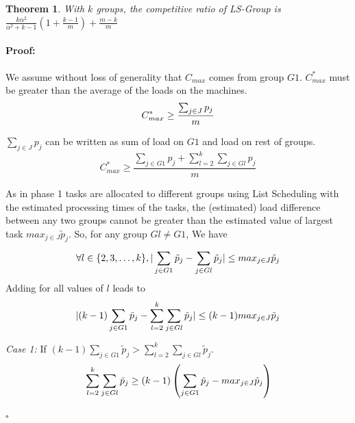 \documentclass[12pt]{article}
\theoremstyle{mystyle}
\newtheorem{theorem}{Theorem}
\newenvironment{myproof}{\paragraph{Proof:}}{\hfill$\square$}
\begin{document}
    \begin{theorem}
      \label{th:strategy3}
      With $k$ groups, the competitive ratio of
      \textit{LS-Group } is $ \frac{k\alpha^{2}}{\alpha^{2}+k-1} (1+
      {\frac{k-1}{m}} ) + \frac{m-k}{m}$
    \end{theorem}
    \begin{myproof} 
      We assume without loss of generality that $ C_{max}$ comes from
      group $G1$. $C_{max}^{*}$ must be greater than the average of the
      loads on the machines.
      \begin{equation}{\nonumber}
        C_{max}^{*} \geq  \frac{\sum_{j \in J}^{}{{p_{j}}}}{m}
      \end{equation}
    
      $\sum_{j \in J }{{p_{j}}}$ can be written as sum of load on $G1$ and
      load on rest of groups.
      \begin{equation}\label{eq11}
        C_{max}^{*} \geq  \frac{\sum_{j \in G1 }^{}{{p_{j}}}+ \sum_{l=2}^{k}\sum_{j \in Gl }^{}{{p_{j}}}}{m}
      \end{equation}
    
      As in phase 1 tasks are allocated to different groups using List
      Scheduling with the estimated processing times of the tasks, the
      (estimated) load difference between any two groups cannot be greater
      than the estimated value of largest task ${max_{j \in J}}{\tilde
        p_{j}}$.  So, for any group $Gl \neq G1$, We have
      \begin{equation}{\nonumber}
    \forall l \in \{2, 3, \dots ,k\}, |\sum_{j \in G1 }^{}{\tilde p_{j}}- \sum_{j \in Gl }^{}{\tilde p_{j}}| \leq {max_{j \in J}}{\tilde p_{j}}
      \end{equation}  
      Adding for all values of $l$ leads to
      \begin{equation}{\nonumber}
        |(k-1)\sum_{j \in G1 }^{}{\tilde p_{j}}- \sum_{l=2}^{k}\sum_{j \in Gl }^{}{\tilde p_{j}}| \leq (k-1) {max_{j \in J}}{\tilde p_{j}}
      \end{equation}
    
      \textit{Case 1:} If $(k-1)\sum_{j \in G1 }^{}{\tilde p_{j}} >
      \sum_{l=2}^{k}\sum_{j \in Gl }^{}{\tilde p_{j}}$.
      \begin{equation}{\nonumber}
        \sum_{l=2}^{k}\sum_{j \in Gl }^{}{\tilde p_{j}} \geq (k-1) \left( \sum_{j \in G1 }^{}{\tilde p_{j}}- {max_{j \in J}}{\tilde p_{j}} \right)
      \end{equation}
    

\end{myproof}
\end{document}
